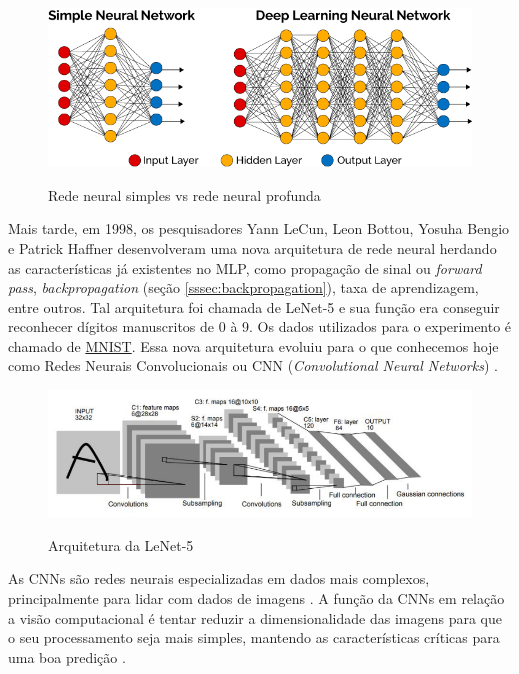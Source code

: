 \begin{figure}[H]
  \centering
  \caption{Rede neural simples vs rede neural profunda}
  \includegraphics[scale=0.6]{figuras/simple-vs-deep-nn.png}
  \label{fig:simple-vs-deep-nn}
\end{figure}

Mais tarde, em 1998, os pesquisadores Yann LeCun, Leon Bottou, Yosuha Bengio e Patrick Haffner desenvolveram uma nova arquitetura de rede neural herdando as características já existentes no MLP, como propagação de sinal ou \textit{forward pass}, \textit{backpropagation} (seção \ref{sssec:backpropagation}), taxa de aprendizagem, entre outros. Tal arquitetura foi chamada de LeNet-5 \cite{le-net} e sua função era conseguir reconhecer dígitos manuscritos de 0 à 9. Os dados utilizados para o experimento é chamado de \href{http://yann.lecun.com/exdb/mnist/}{MNIST}. Essa nova arquitetura evoluiu para o que conhecemos hoje como Redes Neurais Convolucionais ou CNN (\textit{Convolutional Neural Networks}) \cite{goodfellow-et-al-2016}.

\begin{figure}[H]
  \centering
  \caption{Arquitetura da LeNet-5}
  \includegraphics[width=\linewidth]{figuras/le-net.png}
  \label{fig:le-net}
\end{figure}

As CNNs são redes neurais especializadas em dados mais complexos, principalmente para lidar com dados de imagens \cite{goodfellow-et-al-2016}. A função da CNNs em relação a visão computacional é tentar reduzir a dimensionalidade das imagens para que o seu processamento seja mais simples, mantendo as características críticas para uma boa predição \cite{comprehensive-guide-to-cvv}.


